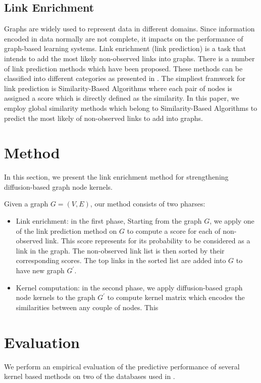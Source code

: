 \documentclass{article}
\begin{document}
\subsection{Link Enrichment}
\label{link-enrichment}
Graphs are widely used to represent data in different domains. Since information encoded in data normally are not complete, it impacts on the performance of graph-based learning systems. Link enrichment (link prediction) is a task that intends to add the most likely non-observed links into graphs. There is a number of link prediction methods which have been proposed. These methods can be classified into different categories as presented in \cite{mitchell80}. The simpliest framwork for link prediction is Similarity-Based Algorithms where each pair of nodes is assigned a score which is directly defined as the similarity. In this paper, we employ global similarity methods which belong to Similarity-Based Algorithms to predict the most likely of non-observed links to add into graphs.

\section{Method}
\label{method}
In this section, we present the link enrichment method for strengthening diffusion-based graph node kernels.

Given a graph $G=(V, E)$, our method consists of two pharses:
\begin{itemize}
\item Link enrichment: in the first phase, Starting from the graph $G$, we apply one of the link prediction method on $G$ to compute a score for each of non-observed link. This score represents for its probability to be considered as a link in the graph. The non-observed link list is then sorted by their corresponding scores. The top links in the sorted list are added into $G$ to have new graph $G^{'}$.
\item Kernel computation: in the second phase, we apply diffusion-based graph node kernels to the graph $G^{'}$ to compute kernel matrix which encodes the similarities between any couple of nodes. This 
\end{itemize}
\section{Evaluation}
\label{evaluation}
We perform an empirical evaluation of the predictive performance of several kernel based methods on two of the databases used in \cite{medk}.
\end{document}
